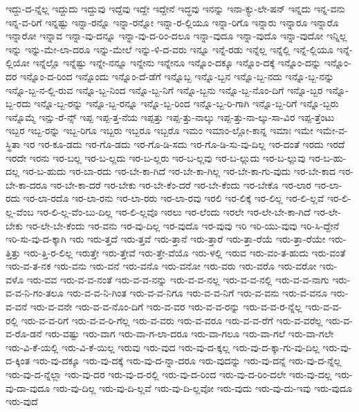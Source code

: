 {ಇದ್ದು-ದ-ನ್ನೆಲ್ಲ
ಇದ್ದುದು
ಇದ್ದುವು
ಇದ್ದೆವು
ಇದ್ದೇ
ಇದ್ದೇನೆ
ಇದ್ಧವು
ಇನನ್ನು
ಇನಾ-ಕ್ಯು-ಲೇ-ಷನ್
ಇನ್ನದು
ಇನ್ನ-ವನು
ಇನ್ನ-ವ-ರಿಗೆ
ಇನ್ನಷ್ಟು
ಇನ್ನಾ-ರನ್ನೊ
ಇನ್ನಾ-ರನ್ನೋ
ಇನ್ನಾ-ರ-ಲ್ಲಿಯೂ
ಇನ್ನಾ-ರಿಗೊ
ಇನ್ನಾರು
ಇನ್ನಾರೂ
ಇನ್ನಾರೊ
ಇನ್ನಾರೋ
ಇನ್ನಾವ
ಇನ್ನಾ-ವು-ದನ್ನೂ
ಇನ್ನಾ-ವು-ದ-ರಿಂ-ದಲೂ
ಇನ್ನಾ-ವುದೂ
ಇನ್ನಾ-ವುದೊ
ಇನ್ನಾ-ವುದೋ
ಇನ್ನಿಲ್ಲ
ಇನ್ನು
ಇನ್ನು-ಮೇ-ಲಾ-ದರೂ
ಇನ್ನು-ಮೇಲೆ
ಇನ್ನು-ಳಿ-ದ-ವರು
ಇನ್ನೂ
ಇನ್ನೆ-ರಡು
ಇನ್ನೆಲ್ಲ
ಇನ್ನೆಲ್ಲಿ
ಇನ್ನೆ-ಲ್ಲಿಯೂ
ಇನ್ನೆ-ಲ್ಲಿಯೋ
ಇನ್ನೆಲ್ಲೊ
ಇನ್ನೆಷ್ಟು
ಇನ್ನೇ-ನನ್ನೂ
ಇನ್ನೇನು
ಇನ್ನೇನೂ
ಇನ್ನೊಂ-ದಕ್ಕೂ
ಇನ್ನೊಂ-ದಕ್ಕೆ
ಇನ್ನೊಂ-ದನ್ನು
ಇನ್ನೊಂ-ದರ
ಇನ್ನೊಂ-ದ-ರಿಂದ
ಇನ್ನೊಂದು
ಇನ್ನೊಂ-ದೆ-ಡೆಗೆ
ಇನ್ನೊಬ್ಬ
ಇನ್ನೊ-ಬ್ಬನ
ಇನ್ನೊ-ಬ್ಬ-ನದು
ಇನ್ನೊ-ಬ್ಬ-ನನ್ನು
ಇನ್ನೊ-ಬ್ಬ-ನ-ಲ್ಲಿ-ರುವ
ಇನ್ನೊ-ಬ್ಬ-ನಿಂದ
ಇನ್ನೊ-ಬ್ಬ-ನಿಗೆ
ಇನ್ನೊ-ಬ್ಬನು
ಇನ್ನೊ-ಬ್ಬ-ನೊಂ-ದಿಗೆ
ಇನ್ನೊ-ಬ್ಬರ
ಇನ್ನೊ-ಬ್ಬ-ರದು
ಇನ್ನೊ-ಬ್ಬ-ರನ್ನು
ಇನ್ನೊ-ಬ್ಬ-ರನ್ನೂ
ಇನ್ನೊ-ಬ್ಬ-ರಿಂದ
ಇನ್ನೊ-ಬ್ಬ-ರಿ-ಗಾಗಿ
ಇನ್ನೊ-ಬ್ಬ-ರಿಗೆ
ಇನ್ನೊ-ಬ್ಬರು
ಇನ್ನೊಮ್ಮೆ
ಇನ್ಷು-ರೆ-ನ್ಸ್
ಇಪ್ಪ
ಇಪ್ಪ-ತ್ತ-ನೆಯ
ಇಪ್ಪತ್ತು
ಇಪ್ಪ-ತ್ತು-ನಾಲ್ಕು
ಇಪ್ಪ-ತ್ತು-ನಾ-ಲ್ಕು-ಸಾ-ವಿರ
ಇಪ್ಪ-ತ್ತೆಂಟು
ಇಬ್ಬರ
ಇಬ್ಬ-ರನ್ನು
ಇಬ್ಬ-ರಿಗೂ
ಇಬ್ಬರು
ಇಬ್ಬರೂ
ಇಬ್ಬರೊ
ಇಮಂ
ಇಮಾಂ-ಲ್ಲೋ-ಕಾನ್ನ
ಇಮಾಃ
ಇಮೇ
ಇಮೇ-ವ-ಸ್ಥಿತಾ
ಇರ
ಇರ-ಕೂ-ಡದು
ಇರ-ಗೊ-ಡದು
ಇರ-ಗೊ-ಡಿ-ಸದು
ಇರ-ಗೊ-ಡಿ-ಸು-ವು-ದಿಲ್ಲ
ಇರ-ದಂತೆ
ಇರದು
ಇರದೆ
ಇರದೇ
ಇರನು
ಇರ-ಬಲ್ಲ
ಇರ-ಬ-ಲ್ಲದು
ಇರ-ಬ-ಲ್ಲರು
ಇರ-ಬ-ಲ್ಲವು
ಇರ-ಬ-ಲ್ಲುದು
ಇರ-ಬ-ಲ್ಲುವು
ಇರ-ಬ-ಹು-ದಲ್ಲ
ಇರ-ಬ-ಹುದು
ಇರ-ಬಾ-ರದು
ಇರ-ಬೇ-ಕಾ-ಗಿದೆ
ಇರ-ಬೇ-ಕಾ-ಗಿಲ್ಲ
ಇರ-ಬೇ-ಕಾ-ಗು-ವುದು
ಇರ-ಬೇ-ಕಾದ
ಇರ-ಬೇ-ಕಾ-ದರೂ
ಇರ-ಬೇ-ಕಾ-ದರೆ
ಇರ-ಬೇಕು
ಇರ-ಬೇ-ಕೆಂ-ದರೆ
ಇರ-ಬೇ-ಕೆಂದು
ಇರ-ಬೇಕೊ
ಇರ-ಲಾರ
ಇರ-ಲಾ-ರದು
ಇರ-ಲಾ-ರದೊ
ಇರ-ಲಾ-ರನು
ಇರ-ಲಾ-ರರು
ಇರ-ಲಾ-ರವು
ಇರಲಿ
ಇರ-ಲಿಕ್ಕೆ
ಇರ-ಲಿಲ್ಲ
ಇರ-ಲಿ-ಲ್ಲವೆ
ಇರ-ಲಿ-ಲ್ಲ-ವೆಂಬ
ಇರ-ಲಿ-ಲ್ಲ-ವೆಂ-ಬು-ದಿಲ್ಲ
ಇರ-ಲಿ-ಲ್ಲವೊ
ಇರಲು
ಇರ-ಲೆಂದು
ಇರಲೇ
ಇರ-ಲೇ-ಬೇ-ಕಾ-ಗಿದೆ
ಇರ-ಲೇ-ಬೇಕು
ಇರ-ಲೇ-ಬೇ-ಕೆಂದು
ಇರ-ವನು
ಇರ-ವು-ದಿಲ್ಲ
ಇರ-ವುದೊ
ಇರ-ವುವು
ಇರಿ
ಇರಿ-ಯು-ವುವು
ಇರಿ-ಸಿ-ದ್ದೇನೆ
ಇರಿ-ಸು-ವು-ದ-ಕ್ಕಾಗಿ
ಇರು
ಇರು-ತ್ತದೆ
ಇರು-ತ್ತವೆ
ಇರು-ತ್ತಾನೆ
ಇರು-ತ್ತಾರೆ
ಇರು-ತ್ತಾ-ರೆಯೆ
ಇರು-ತ್ತಾ-ರೆಯೇ
ಇರು-ತ್ತಿತ್ತು
ಇರು-ತ್ತಿ-ರ-ಲಿಲ್ಲ
ಇರುತ್ತೇ
ಇರು-ತ್ತೇವೆ
ಇರು-ತ್ತೇ-ವೆಯೊ
ಇರು-ಳಲ್ಲಿ
ಇರುವ
ಇರು-ವಂ-ತ-ಹುದು
ಇರು-ವಂತೆ
ಇರು-ವ-ತ-ನಕ
ಇರು-ವನು
ಇರು-ವನೆ
ಇರು-ವನೊ
ಇರು-ವನೋ
ಇರು-ವರು
ಇರು-ವರೊ
ಇರು-ವರೋ
ಇರು-ವಳೊ
ಇರು-ವವ
ಇರು-ವ-ವ-ನಂತೆ
ಇರು-ವ-ವ-ನನ್ನು
ಇರು-ವ-ವ-ನಲ್ಲ
ಇರು-ವ-ವ-ನಲ್ಲಿ
ಇರು-ವ-ವ-ನಾಗು
ಇರು-ವ-ವ-ನಿ-ಗಂ-ತಲೂ
ಇರು-ವ-ವ-ನಿ-ಗಿಂತ
ಇರು-ವ-ವ-ನಿಗೂ
ಇರು-ವ-ವ-ನಿಗೆ
ಇರು-ವ-ವನು
ಇರು-ವ-ವನೂ
ಇರು-ವ-ವನೆ
ಇರು-ವ-ವನೇ
ಇರು-ವ-ವ-ನೊಂ-ದಿಗೆ
ಇರು-ವ-ವರ
ಇರು-ವ-ವ-ರನ್ನು
ಇರು-ವ-ವ-ರ-ನ್ನೆಲ್ಲ
ಇರು-ವ-ವ-ರಲ್ಲಿ
ಇರು-ವ-ವ-ರಿಗೆ
ಇರು-ವ-ವ-ರಿ-ಗೆಲ್ಲ
ಇರು-ವ-ವರು
ಇರು-ವ-ವರೂ
ಇರು-ವ-ವ-ರೆಗೆ
ಇರು-ವ-ವರೆಲ್ಲ
ಇರು-ವ-ವ-ರೊ-ಡನೆ
ಇರು-ವಷ್ಟು
ಇರು-ವಾಗ
ಇರು-ವಾ-ಗ-ಲಾ-ದರೂ
ಇರು-ವಾ-ಗಲೂ
ಇರು-ವಾ-ಗಲೆ
ಇರು-ವಾ-ಗಲೇ
ಇರು-ವಿ-ಕೆ-ಯಲ್ಲಿ
ಇರು-ವಿ-ಕೆ-ಯಿಲ್ಲ
ಇರುವು
ಇರು-ವುದ
ಇರು-ವು-ದ-ಕ್ಕಲ್ಲ
ಇರು-ವು-ದ-ಕ್ಕಾ-ಗು-ವು-ದಿಲ್ಲ
ಇರು-ವು-ದ-ಕ್ಕಿಂತ
ಇರು-ವು-ದಕ್ಕೂ
ಇರು-ವು-ದಕ್ಕೆ
ಇರು-ವು-ದ-ನ್ನಾ-ದರೂ
ಇರು-ವುದನ್ನು
ಇರು-ವು-ದನ್ನೆ
ಇರು-ವು-ದ-ನ್ನೆಲ್ಲ
ಇರು-ವು-ದ-ನ್ನೆಲ್ಲಾ
ಇರು-ವು-ದರ
ಇರು-ವು-ದ-ರಲ್ಲಿ
ಇರು-ವು-ದ-ರಿಂದ
ಇರು-ವು-ದ-ರಿಂ-ದಲೇ
ಇರು-ವು-ದಲ್ಲ
ಇರು-ವು-ದಾ-ವುದೂ
ಇರು-ವು-ದಿಲ್ಲ
ಇರು-ವು-ದಿ-ಲ್ಲವೆ
ಇರು-ವು-ದಿ-ಲ್ಲವೋ
ಇರು-ವುದು
ಇರು-ವು-ದು-ಇವು
ಇರು-ವುದೂ
ಇರು-ವುದೆ
}

